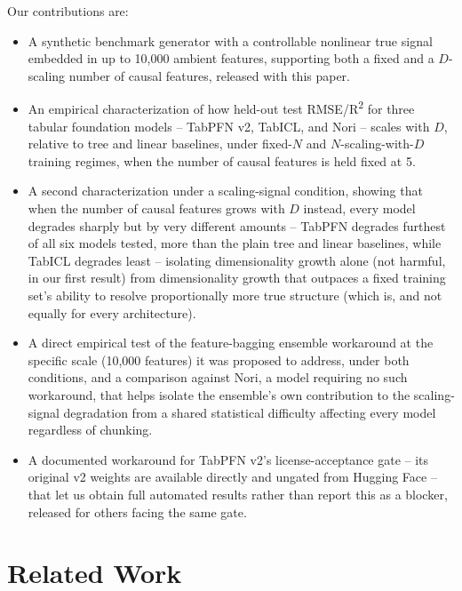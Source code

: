\documentclass{article}
\begin{document}
Our contributions are:
\begin{itemize}
\item A synthetic benchmark generator with a controllable nonlinear true signal
      embedded in up to 10,000 ambient features, supporting both a fixed and a
      $D$-scaling number of causal features, released with this paper.
\item An empirical characterization of how held-out test RMSE/R\textsuperscript{2} for
      three tabular foundation models -- TabPFN v2, TabICL, and Nori -- scales with
      $D$, relative to tree and linear baselines, under fixed-$N$ and
      $N$-scaling-with-$D$ training regimes, when the number of causal features is
      held fixed at 5.
\item A second characterization under a scaling-signal condition, showing that when the
      number of causal features grows with $D$ instead, every model degrades sharply
      but by very different amounts -- TabPFN degrades furthest of all six models
      tested, more than the plain tree and linear baselines, while TabICL degrades
      least -- isolating dimensionality growth alone (not harmful, in our first
      result) from dimensionality growth that outpaces a fixed training set's ability
      to resolve proportionally more true structure (which is, and not equally for
      every architecture).
\item A direct empirical test of the feature-bagging ensemble workaround
      \citep{feuer2023scaling} at the specific scale (10,000 features) it was proposed
      to address, under both conditions, and a comparison against Nori, a model
      requiring no such workaround, that helps isolate the ensemble's own contribution
      to the scaling-signal degradation from a shared statistical difficulty affecting
      every model regardless of chunking.
\item A documented workaround for TabPFN v2's license-acceptance gate -- its original
      v2 weights are available directly and ungated from Hugging Face -- that let us
      obtain full automated results rather than report this as a blocker, released for
      others facing the same gate.
\end{itemize}

\section{Related Work}
\label{sec:related}
\end{document}
